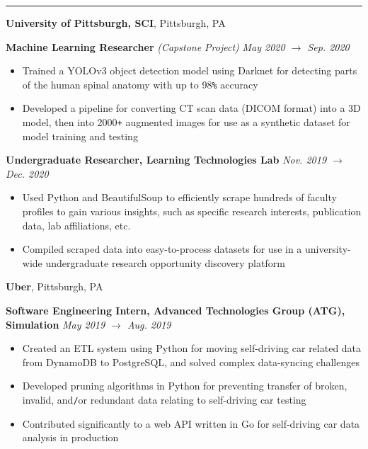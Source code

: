\documentclass[10pt]{article}
\begin{document}
\begin{flushleft}
		\hrule

		\vspace{2.25mm}
		\textbf{University of Pittsburgh, SCI}, Pittsburgh, PA\\
		\begin{leftli}
         {\small \textbf{Machine Learning Researcher} \textit{(Capstone Project)}}  \hfill \textit{\small May 2020 $\rightarrow$ Sep. 2020}
			\begin{itemize}
				\item Trained a YOLOv3 object detection model using Darknet for detecting parts of the human spinal anatomy with up to 98\verb!%! accuracy
				\vspace{-2mm}
				\item Developed a pipeline for converting CT scan data (DICOM format) into a 3D model, then into 2000\texttt{+} augmented images for use as a synthetic dataset for model training and testing
			\end{itemize}
		\end{leftli}

		\begin{leftli}
			{\small \textbf{Undergraduate Researcher, Learning Technologies Lab}} \hfill \textit{\small Nov. 2019 $\rightarrow$ Dec. 2020}
			\begin{itemize}
				\item Used Python and BeautifulSoup to efficiently scrape hundreds of faculty profiles to gain various insights, such as specific research interests, publication data, lab affiliations, etc.
				\vspace{-2mm}
				\item Compiled scraped data into easy-to-process datasets for use in a university-wide undergraduate research opportunity discovery platform
			\end{itemize}
		\end{leftli}

		\vspace{-1.50mm}
		\textbf{Uber}, Pittsburgh, PA\\
		\begin{leftli}
			{\small \textbf{Software Engineering Intern, Advanced Technologies Group (ATG), Simulation}} \hfill \textit{\small May 2019 $\rightarrow$ Aug. 2019}
			\begin{itemize}
				\item Created an ETL system using Python for moving self-driving car related data from DynamoDB to PostgreSQL, and solved complex data-syncing challenges
				\vspace{-2mm}
				\item Developed pruning algorithms in Python for preventing transfer of broken, invalid, and\texttt{/}or redundant data relating to self-driving car testing
				\vspace{-2mm}
				\item Contributed significantly to a web API written in Go for self-driving car data analysis in production
			\end{itemize}
		\end{leftli}


\end{flushleft}
\end{document}
